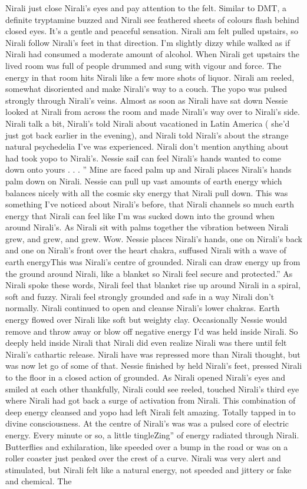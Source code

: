 \documentclass[12pt]{book}
\begin{document}
Nirali just close Nirali's eyes and pay attention to the felt. Similar to DMT, a definite tryptamine buzzed and Nirali see feathered sheets of colours flash behind closed eyes. It's a gentle and peaceful sensation. Nirali am felt pulled upstairs, so Nirali follow Nirali's feet in that direction. I'm slightly dizzy while walked as if Nirali had consumed a moderate amount of alcohol. When Nirali get upstairs the lived room was full of people drummed and sung with vigour and force. The energy in that room hits Nirali like a few more shots of liquor. Nirali am reeled, somewhat disoriented and make Nirali's way to a couch. The yopo was pulsed strongly through Nirali's veins. Almost as soon as Nirali have sat down Nessie looked at Nirali from across the room and made Nirali's way over to Nirali's side. Nirali talk a bit, Nirali's told Nirali about vacationed in Latin America ( she'd just got back earlier in the evening), and Nirali told Nirali's about the strange natural psychedelia I've was experienced. Nirali don't mention anything about had took yopo to Nirali's. Nessie saiI can feel Nirali's hands wanted to come down onto yours . . . '' Mine are faced palm up and Nirali places Nirali's hands palm down on Nirali. Nessie can pull up vast amounts of earth energy which balances nicely with all the cosmic sky energy that Nirali pull down. This was something I've noticed about Nirali's before, that Nirali channels so much earth energy that Nirali can feel like I'm was sucked down into the ground when around Nirali's. As Nirali sit with palms together the vibration between Nirali grew, and grew, and grew. Wow. Nessie places Nirali's hands, one on Nirali's back and one on Nirali's front over the heart chakra, suffused Nirali with a wave of earth energyThis was Nirali's centre of grounded. Nirali can draw energy up from the ground around Nirali, like a blanket so Nirali feel secure and protected.'' As Nirali spoke these words, Nirali feel that blanket rise up around Nirali in a spiral, soft and fuzzy. Nirali feel strongly grounded and safe in a way Nirali don't normally. Nirali continued to open and cleanse Nirali's lower chakras. Earth energy flowed over Nirali like soft but weighty clay. Occasionally Nessie would remove and throw away or blow off negative energy I'd was held inside Nirali. So deeply held inside Nirali that Nirali did even realize Nirali was there until felt Nirali's cathartic release. Nirali have was repressed more than Nirali thought, but was now let go of some of that. Nessie finished by held Nirali's feet, pressed Nirali to the floor in a closed action of grounded. As Nirali opened Nirali's eyes and smiled at each other thankfully, Nirali could see reeled, touched Nirali's third eye where Nirali had got back a surge of activation from Nirali. This combination of deep energy cleansed and yopo had left Nirali felt amazing. Totally tapped in to divine consciousness. At the centre of Nirali's was was a pulsed core of electric energy. Every minute or so, a little tingleZing'' of energy radiated through Nirali. Butterflies and exhilaration, like speeded over a bump in the road or was on a roller coaster just peaked over the crest of a curve. Nirali was very alert and stimulated, but Nirali felt like a natural energy, not speeded and jittery or fake and chemical. The 
\end{document}
